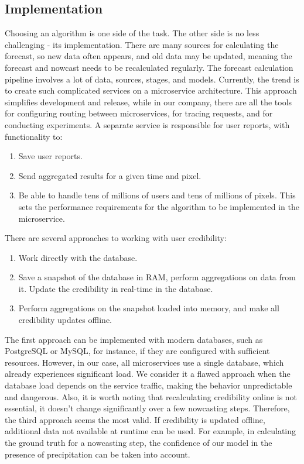 \documentclass[conference]{IEEEtran}
\begin{document}
\subsection{Implementation}

Choosing an algorithm is one side of the task. The other side is no less challenging - its implementation. There are many sources for calculating the forecast, so new data often appears, and old data may be updated, meaning the forecast and nowcast needs to be recalculated regularly. The forecast calculation pipeline involves a lot of data, sources, stages, and models. Currently, the trend is to create such complicated services on a microservice architecture. This approach simplifies development and release, while in our company, there are all the tools for configuring routing between microservices, for tracing requests, and for conducting experiments. A separate service is responsible for user reports, with functionality to:
\begin{enumerate}
	\item Save user reports.
	\item Send aggregated results for a given time and pixel.
	\item Be able to handle tens of millions of users and tens of millions of pixels. This sets the performance requirements for the algorithm to be implemented in the microservice.
\end{enumerate}

There are several approaches to working with user credibility:
\begin{enumerate}
	\item Work directly with the database.
	\item Save a snapshot of the database in RAM, perform aggregations on data from it. Update the credibility in real-time in the database.
	\item Perform aggregations on the snapshot loaded into memory, and make all credibility updates offline.
\end{enumerate}

The first approach can be implemented with modern databases, such as PostgreSQL or MySQL, for instance, if they are configured with sufficient resources. However, in our case, all microservices use a single database, which already experiences significant load. We consider it a flawed approach when the database load depends on the service traffic, making the behavior unpredictable and dangerous. Also, it is worth noting that recalculating credibility online is not essential, it doesn't change significantly over a few nowcasting steps. Therefore, the third approach seems the most valid. If credibility is updated offline, additional data not available at runtime can be used. For example, in calculating the ground truth for a nowcasting step, the confidence of our model in the presence of precipitation can be taken into account.
\end{document}
